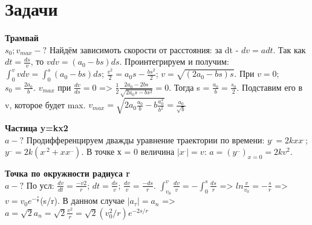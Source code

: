 \documentclass{article}
\begin{document}
\section{Задачи}
\begin{minipage}{.3\textwidth}
\textbf{Трамвай}\\
$s_0; v_{max} -?$
Найдём зависимоть скорости от расстояния: за dt - $dv=adt$. Так как $dt = \frac{ds}{v}$, то $vdv =(a_0 -bs)ds$. Проинтегрируем и получим: $\int_{0}^{v}vdv = \int_{0}^{s} (a_0 -bs)ds$;
$\frac{v^2}{2} = a_0s -\frac{bs^2}{2}$; $v = \sqrt{(2a_0 -bs)s} $. При $v = 0$; \textbf{$s_0 = \frac{2a_0}{b}$}. $v_{max}$ при $\frac{dv}{ds} = 0$ => $\frac{1}{2}\frac{2a_0-2bs}{\sqrt{2a_0s-bs^2}}=0$. Тогда s = $\frac{a_0}{b} = \frac{s_0}{2}$. Подставим его в v, которое будет max. $v_{max}=\sqrt{2a_0\frac{a_0}{b}-b\frac{a^2_0}{b^2}} = \frac{a_0}{\sqrt{b}}$
\end{minipage}
\hfill
\begin{minipage}{.3\textwidth}
\textbf{Частица y=kx2}\\
$a-?$
Продифференцируем дважды уравнение траектории по времени: $y^.=2kxx^.$; $y^{..} = 2k(x^{.2}+xx^{..})$.
В точке х = 0 величина $|x^.|=v$: $a=(y^{..})_{x=0}=2kv^2$. 
\end{minipage}
\hfill
\begin{minipage}{.3\textwidth}
\textbf{Точка по окружности радиуса r}\\
$a-?$
По усл: $\frac{dv}{dt} = \frac{-v2}{r}$; $dt=\frac{ds}{v}$; $\frac{dv}{v} = \frac{-ds}{r}$. $\int_{v_0}^{v}\frac{dv}{v}=-\int_{0}^{s}\frac{ds}{r}$ => $ln\frac{v}{v_0}=-\frac{s}{r}$ => $v=v_0e^{-\frac{s}{r}}$(s/r).
В данном случае $|a_{\tau}|=a_n$ => $a=\sqrt{2}a_n=\sqrt{2}\frac{v^2}{r} = \sqrt{2}(v_0^2/r)e^{-2s/r}$
\end{minipage}
\end{document}
